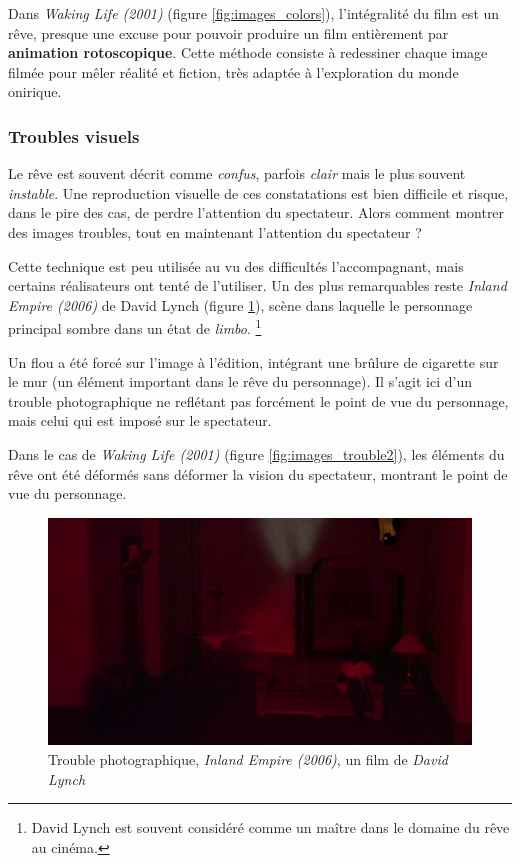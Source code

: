 \documentclass[../main.tex]{subfile}
\begin{document}
Dans \textit{Waking Life (2001)} (figure \ref{fig:images_colors}), l'intégralité
du film est un rêve, presque une excuse pour pouvoir produire un film
entièrement par \textbf{animation rotoscopique}. Cette méthode consiste à
redessiner chaque image filmée pour mêler réalité et fiction, très adaptée à
l'exploration du monde onirique.

\subsubsection{Troubles visuels}

Le rêve est souvent décrit comme \emph{confus}, parfois \emph{clair} mais le
plus souvent \emph{instable}. Une reproduction visuelle de ces constatations
est bien difficile et risque, dans le pire des cas, de perdre l'attention du
spectateur. Alors comment montrer des images troubles, tout en maintenant
l'attention du spectateur ?

Cette technique est peu utilisée au vu des difficultés l'accompagnant, mais
certains réalisateurs ont tenté de l'utiliser. Un des plus remarquables reste
\textit{Inland Empire (2006)} de David Lynch (figure \ref{fig:images_trouble}),
scène dans laquelle le personnage principal sombre dans un état de
\emph{limbo}. \footnote{David Lynch est souvent considéré comme un maître dans
le domaine du rêve au cinéma.}

Un flou a été forcé sur l'image à l'édition, intégrant une brûlure de cigarette
sur le mur (un élément important dans le rêve du personnage). Il s'agit ici d'un
trouble photographique ne reflétant pas forcément le point de vue du personnage,
mais celui qui est imposé sur le spectateur.

Dans le cas de \textit{Waking Life (2001)} (figure \ref{fig:images_trouble2}),
les éléments du rêve ont été déformés sans déformer la vision du spectateur,
montrant le point de vue du personnage.

\begin{figure}
    \centering
    \includegraphics[width=\linewidth]{images/trouble}
    \caption{Trouble photographique, \textit{Inland Empire (2006)}, un film de
             \textit{David Lynch}}
    \label{fig:images_trouble}
\end{figure}
\end{document}
